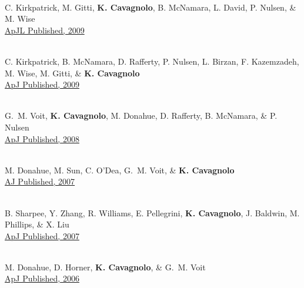 \documentclass[12pt]{cv}
\newcommand{\myhead}{Cavagnolo, Publications}
\begin{document}
\begin{llist}

{}\\
C. Kirkpatrick, M. Gitti, {\bf K. Cavagnolo}, B. McNamara, L. David, P. Nulsen, \& M. Wise\\
\href{http://adsabs.harvard.edu/abs/2009arXiv0909.2252K}{ApJL Published, 2009}

{}\\
C. Kirkpatrick, B. McNamara, D. Rafferty, P. Nulsen, L. Birzan, F. Kazemzadeh, M. Wise, M. Gitti, \& {\bf K. Cavagnolo}\\
\href{http://adsabs.harvard.edu/abs/2009ApJ...697..867K}{ApJ Published, 2009}

{}\\
G.~M. Voit, {\bf K. Cavagnolo}, M. Donahue, D. Rafferty, B. McNamara, \& P. Nulsen\\
\href{http://adsabs.harvard.edu/abs/2008ApJ...681L...5V}{ApJ Published, 2008}

{}\\
M. Donahue, M. Sun, C. O'Dea, G.~M. Voit, \& {\bf K. Cavagnolo}\\
\href{http://adsabs.harvard.edu/abs/2007AJ....134...14D}{AJ Published, 2007}

{}\\
B. Sharpee, Y. Zhang, R. Williams, E. Pellegrini, {\bf K. Cavagnolo}, J. Baldwin, M. Phillips, \& X. Liu\\
\href{http://adsabs.harvard.edu/abs/2007ApJ...659.1265S}{ApJ Published, 2007}

{}\\
M. Donahue, D. Horner, {\bf K. Cavagnolo}, \& G.~M. Voit\\
\href{http://adsabs.harvard.edu/abs/2006ApJ...643..730D}{ApJ Published, 2006}

\markright{\myhead}



\end{llist}
\end{document}
